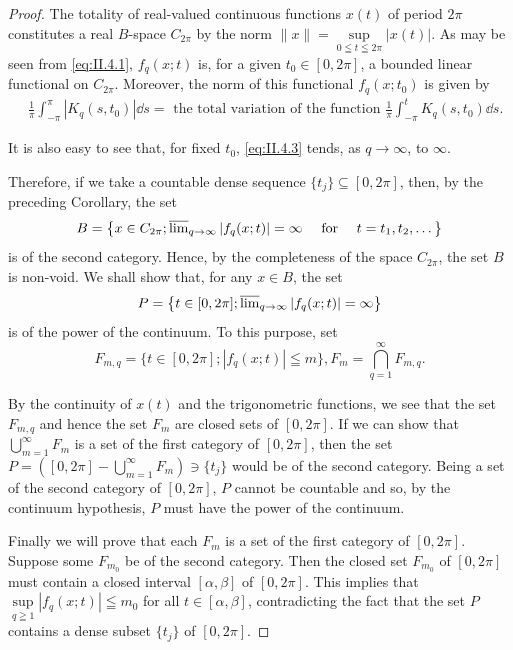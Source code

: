 \begin{proof}
 The totality of real-valued continuous functions $x(t)$ of period $2\pi$ constitutes a real $B$-space $C_{2\pi}$ by the norm $\|x\| = \sup\limits_{0 \leqq t \leqq 2\pi} |x(t)|$. As may be seen from \eqref{eq:II.4.1}, $f_q(x; t)$ is, for a given $t_0 \in [0, 2\pi]$, a bounded linear functional on $C_{2\pi}$. Moreover, the norm of this functional $f_q(x; t_0)$ is given by 
\begin{equation}\label{eq:II.4.3}
\begin{aligned}
&\frac {1}{\pi} \int_{- \pi} ^{\pi} | K _{q} (s, t _{0}) | \dd s = \text{ the total variation of the function } \frac {1}{\pi} \int_{- \pi} ^{t} K _{q} (s, t _{0}) \dd s.
\end{aligned}
\end{equation}

It is also easy to see that, for fixed $t_0$, \eqref{eq:II.4.3} tends, as $q \to \infty$, to $\infty$. 

Therefore, if we take a countable dense sequence $\{t_j\} \subseteq [0, 2\pi]$, then, by the preceding Corollary, the set 
\[
B = \left\{x \in C _{2 \pi}; \varlimsup\limits_{q \rightarrow \infty} | f _{q} (x; t) | = \infty \quad \text{ for } \quad t = t _{1}, t _{2}, \dots \right\}
\]
is of the second category. Hence, by the completeness of the space $C_{2\pi}$, the set $B$ is non-void. We shall show that, for any $x \in B$, the set 
\[
P = \left\{t \in [ 0, 2 \pi ]; \varlimsup\limits_{q \rightarrow \infty} | f _{q} (x; t) | = \infty \right\}
\]
is of the power of the continuum. To this purpose, set 
\[
F _{m,q} = \{t \in [ 0, 2 \pi ]; | f _{q} (x; t) | \leqq m \}, F _{m} = \bigcap\limits_{q=1} ^{\infty} F _{m,q}.
\]

By the continuity of $x(t)$ and the trigonometric functions, we see that the set $F_{m,q}$ and hence the set $F_{m}$ are closed sets of $[0, 2\pi]$. If we can show that $\bigcup\limits_{m=1}^{\infty} F_{m}$ is a set of the first category of $[0, 2\pi]$, then the set $P = \left([0, 2\pi] - \bigcup\limits_{m=1}^{\infty} F_{m}\right) \ni \{t_j\}$ would be of the second category. Being a set of the second category of $[0, 2\pi]$, $P$ cannot be countable and so, by the continuum hypothesis, $P$ must have the power of the continuum. 


Finally we will prove that each $F_{m}$ is a set of the first category of $[0, 2\pi]$. Suppose some $F_{m_0}$ be of the second category. Then the closed set $F_{m_0}$ of $[0, 2\pi]$ must contain a closed interval $[\alpha, \beta]$ of $[0, 2\pi]$. This implies that $\sup\limits_{q \geqq 1} |f_q(x; t)| \leqq m_0$ for all $t \in [\alpha, \beta]$, contradicting the fact that the set $P$ contains a dense subset $\{t_j\}$ of $[0, 2\pi]$.
\end{proof}

